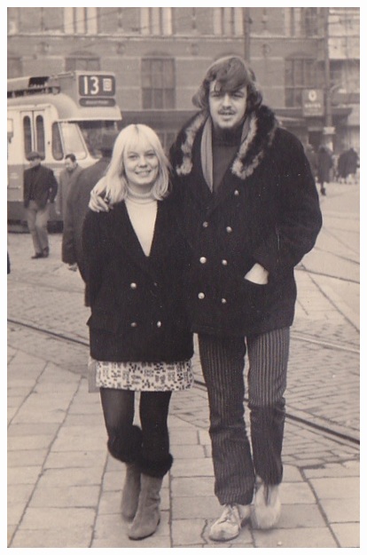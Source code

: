 \documentclass[12pt,twoside, openright]{memoir}
\begin{document}
\begin{figure}
\includegraphics[width=\textwidth]{img/ch31/jeugd}
\end{figure} 
\end{document}
